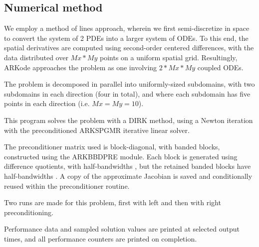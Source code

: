 \documentclass[letterpaper,10pt,english]{sphinxmanual}
\begin{document}
\subsection{Numerical method}
\label{c_parallel:numerical-method}
We employ a method of lines approach, wherein we first
semi-discretize in space to convert the system of 2 PDEs into a larger
system of ODEs.  To this end, the spatial derivatives are computed
using second-order centered differences, with the data distributed
over $Mx*My$ points on a uniform spatial grid.  Resultingly, ARKode
approaches the problem as one involving $2*Mx*My$ coupled ODEs.

The problem is decomposed in parallel into uniformly-sized subdomains,
with two subdomains in each direction (four in total), and where each
subdomain has five points in each direction (i.e. $Mx=My=10$).

This program solves the problem with a DIRK method, using a Newton
iteration with the preconditioned ARKSPGMR iterative linear solver.

The preconditioner matrix used is block-diagonal, with banded blocks,
constructed using the ARKBBDPRE module.  Each block is generated using
difference quotients, with half-bandwidths , but
the retained banded blocks have half-bandwidths .
A copy of the approximate Jacobian is saved and conditionally reused
within the preconditioner routine.

Two runs are made for this problem, first with left and then with
right preconditioning.

Performance data and sampled solution values are printed at
selected output times, and all performance counters are printed
on completion.
\end{document}
